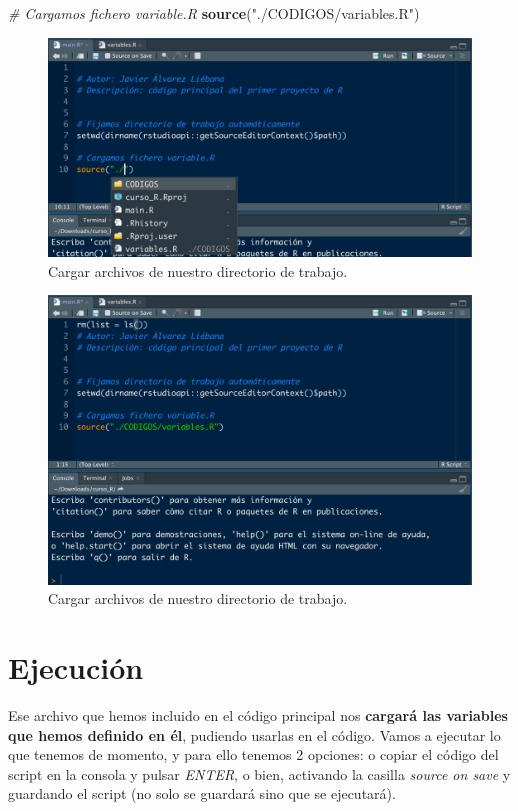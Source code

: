 \documentclass[11pt,]{book}
\newenvironment{Shaded}{\begin{snugshade}}{\end{snugshade}}
\newcommand{\CommentTok}[1]{\textcolor[rgb]{0.37,0.37,0.37}{\textit{#1}}}
\newcommand{\KeywordTok}[1]{\textcolor[rgb]{0.27,0.27,0.27}{\textbf{#1}}}
\newcommand{\NormalTok}[1]{#1}
\newcommand{\StringTok}[1]{\textcolor[rgb]{0.5,0.5,0.5}{#1}}
\begin{document}
\begin{Shaded}
\begin{Highlighting}[]
\CommentTok{# Cargamos fichero variable.R}
\KeywordTok{source}\NormalTok{(}\StringTok{"./CODIGOS/variables.R"}\NormalTok{)}
\end{Highlighting}
\end{Shaded}

\begin{figure}

{\centering \includegraphics[width=0.5\linewidth]{./img/menu_carpetas} 

}

\caption{Cargar archivos de nuestro directorio de trabajo.}\label{fig:menu-carpetas}
\end{figure}

\begin{figure}

{\centering \includegraphics[width=0.5\linewidth]{./img/menu_carpetas1} 

}

\caption{Cargar archivos de nuestro directorio de trabajo.}\label{fig:menu-carpetas1}
\end{figure}

\hypertarget{ejecuciuxf3n}{%
\section{Ejecución}\label{ejecuciuxf3n}}

Ese archivo que hemos incluido en el código principal nos \textbf{cargará las variables que hemos definido en él}, pudiendo usarlas en el código. Vamos a ejecutar lo que tenemos de momento, y para ello tenemos 2 opciones: o copiar el código del script en la consola y pulsar \emph{ENTER}, o bien, activando la casilla \emph{source on save} y guardando el script (no solo se guardará sino que se ejecutará).
\end{document}
